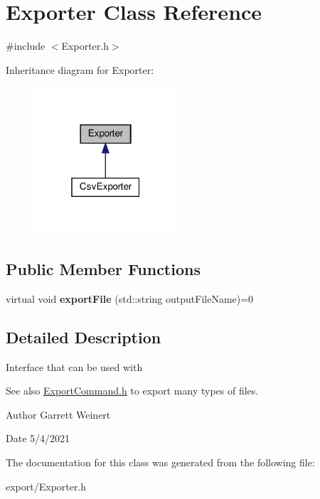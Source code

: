 \hypertarget{classExporter}{}\section{Exporter Class Reference}
\label{classExporter}


{\ttfamily \#include $<$Exporter.\+h$>$}



Inheritance diagram for Exporter\+:
\nopagebreak
\begin{figure}[H]
\begin{center}
\leavevmode
\includegraphics[width=151pt]{da/da9/classExporter__inherit__graph}
\end{center}
\end{figure}
\subsection*{Public Member Functions}
\begin{DoxyCompactItemize}
\item 
\mbox{\label{classExporter_abb54b4b0d98b94fb1b457c49fb20b4fb}} 
virtual void {\bfseries export\+File} (std\+::string output\+File\+Name)=0
\end{DoxyCompactItemize}


\subsection{Detailed Description}
Interface that can be used with \begin{DoxySeeAlso}{See also}
\hyperlink{ExportCommand_8h_source}{Export\+Command.\+h} to export many types of files. 
\end{DoxySeeAlso}
\begin{DoxyAuthor}{Author}
Garrett Weinert 
\end{DoxyAuthor}
\begin{DoxyDate}{Date}
5/4/2021 
\end{DoxyDate}


The documentation for this class was generated from the following file\+:\begin{DoxyCompactItemize}
\item 
export/Exporter.\+h\end{DoxyCompactItemize}
